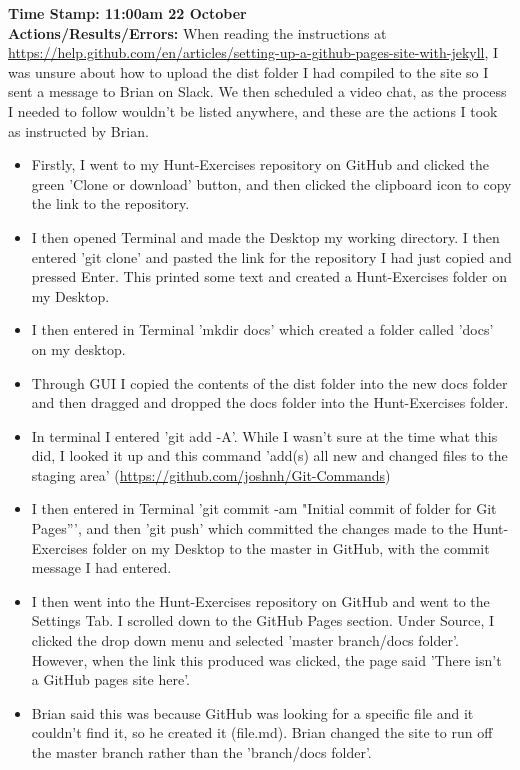 \documentclass{article}
\begin{document}
\begin{FlushLeft}
\textbf{Time Stamp: 11:00am 22 October} \\
\textbf{Actions/Results/Errors:} When reading the instructions at \url{https://help.github.com/en/articles/setting-up-a-github-pages-site-with-jekyll}, I was unsure about how to upload the dist folder I had compiled to the site so I sent a message to Brian on Slack. We then scheduled a video chat, as the process I needed to follow wouldn't be listed anywhere, and these are the actions I took as instructed by Brian.
\begin{itemize}
    \item Firstly, I went to my Hunt-Exercises repository on GitHub and clicked the green 'Clone or download' button, and then clicked the clipboard icon to copy the link to the repository.
    \item I then opened Terminal and made the Desktop my working directory. I then entered 'git clone' and pasted the link for the repository I had just copied and pressed Enter. This printed some text and created a Hunt-Exercises folder on my Desktop.
    \item I then entered in Terminal 'mkdir docs' which created a folder called 'docs' on my desktop.
    \item Through GUI I copied the contents of the dist folder into the new docs folder and then dragged and dropped the docs folder into the Hunt-Exercises folder.
    \item In terminal I entered 'git add -A'. While I wasn't sure at the time what this did, I looked it up and this command 'add(s) all new and changed files to the staging area' (\url{https://github.com/joshnh/Git-Commands})
    \item I then entered in Terminal 'git commit -am "Initial commit of folder for Git Pages”', and then 'git push' which committed the changes made to the Hunt-Exercises folder on my Desktop to the master in GitHub, with the commit message I had entered.
    \item I then went into the Hunt-Exercises repository on GitHub and went to the Settings Tab. I scrolled down to the GitHub Pages section. Under Source, I clicked the drop down menu and selected 'master branch/docs folder'. However, when the link this produced was clicked, the page said 'There isn’t a GitHub pages site here'.
    \item Brian said this was because GitHub was looking for a specific file and it couldn't find it, so he created it (file.md). Brian changed the site to run off the master branch rather than the 'branch/docs folder'.

\end{itemize}
\end{FlushLeft}
\end{document}
